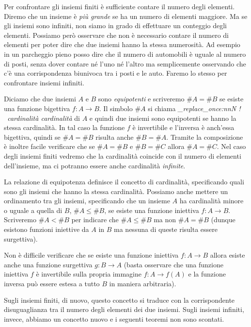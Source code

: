 \documentclass[italian,a4paper,twosides,headinclude]{scrbook}
\newcommand\stripExclamation[1]{
\def\tmp{#1}
\regex_replace_once:nnN { ! } { \  }\tmp
\tmp}
\newcommand{\mynote}[1]{\marginnote{{\footnotesize\stripExclamation{#1}}}}
\newcommand{\myemph}[2][]{%
  \emph{\stripExclamation{#2}}%
  \ifthenelse{\isempty{#1}}%
    {\mynote{#2}%
    \index{#2}}%
    {\mynote{#2}%
     \ifthenelse{\isempty{}}%
      {\index{#2}}%
      {\index{}}}}%
\begin{document}
Per confrontare gli insiemi finiti è sufficiente contare il numero degli elementi.
Diremo che un insieme è \emph{più grande} se ha un numero di elementi maggiore.
Ma se gli insiemi sono infiniti, non siamo in grado di effettuare un conteggio
degli elementi. Possiamo però osservare che non è necessario contare il numero
di elementi per poter dire che due insiemi hanno la stessa numerosità.
Ad esempio in un parcheggio pieno posso dire che il numero di automobili
è uguale al numero di posti, senza dover contare né l'uno né l'altro ma semplicemente
osservando che c'è una corrispondenza biunivoca tra i posti e le auto. Faremo
lo stesso per confrontare insiemi infiniti.

Diciamo che due insiemi $A$ e $B$ sono \emph{equipotenti} e scriveremo $\#A = \#B$
\index{\#}%
se esiste una funzione bigettiva $f\colon A \to B$.
Il simbolo $\#A$ si chiama \myemph{cardinalità} di $A$ e quindi due insiemi
sono equipotenti se hanno la stessa cardinalità.
In tal caso la funzione
$f$ è invertibile e l'inversa è anch'essa bigettiva,
quindi se $\#A = \#B$ risulta anche $\#B = \#A$.
Tramite la composizione è inoltre facile verificare che se $\#A = \#B$ e $\#B = \#C$
allora $\#A = \#C$.
Nel caso degli insiemi finiti vedremo che la cardinalità coincide con il
numero di elementi dell'insieme, ma ci potranno essere anche cardinalità
\emph{infinite}.

La relazione di equipotenza definisce il concetto di cardinalità, specificando
quali sono gli insiemi che hanno la stessa cardinalità. Possiamo anche mettere
un ordinamento tra gli insiemi, specificando che un insieme $A$ ha cardinalità
minore o uguale a quella di $B$, $\#A\le \#B$, se esiste una funzione
iniettiva $f\colon A \to B$. Scriveremo $\#A < \#B$ per indicare che
$\#A \le \#B$ ma non $\#A = \#B$ (dunque esistono funzioni iniettive da $A$ in $B$
ma nessuna di queste risulta essere surgettiva).

Non è difficile verificare che se esiste una funzione iniettiva $f\colon A\to B$
allora esiste anche una funzione surgettiva $g\colon B\to A$
(basta osservare che una funzione iniettiva $f$ è invertibile sulla propria
immagine $f\colon A \to f(A)$ e la funzione inversa può essere estesa a
tutto $B$ in maniera arbitraria).

Sugli insiemi finiti, di nuovo, questo concetto
si traduce con la corrispondente
disuguaglianza tra il numero degli elementi dei due insiemi.
Sugli insiemi infiniti, invece, abbiamo un concetto nuovo e i seguenti teoremi
non sono scontati.
\end{document}
